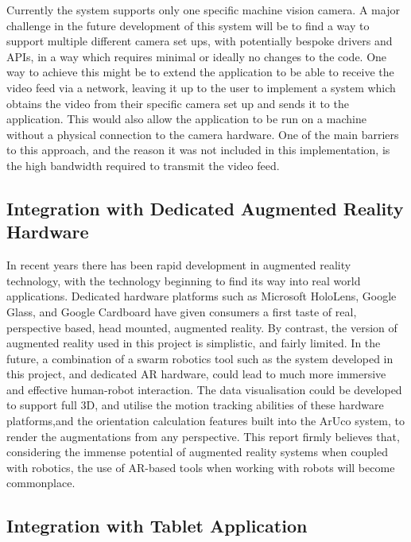 Currently the system supports only one specific machine vision camera. A major challenge in the future development of this system will be to find a way to support multiple different camera set ups, with potentially bespoke drivers and APIs, in a way which requires minimal or ideally no changes to the code. One way to achieve this might be to extend the application to be able to receive the video feed via a network, leaving it up to the user to implement a system which obtains the video from their specific camera set up and sends it to the application. This would also allow the application to be run on a machine without a physical connection to the camera hardware. One of the main barriers to this approach, and the reason it was not included in this implementation, is the high bandwidth required to transmit the video feed.


\subsection{Integration with Dedicated Augmented Reality Hardware}

In recent years there has been rapid development in augmented reality technology, with the technology beginning to find its way into real world applications. Dedicated hardware platforms such as Microsoft HoloLens, Google Glass, and Google Cardboard have given consumers a first taste of real, perspective based, head mounted, augmented reality. By contrast, the version of augmented reality used in this project is simplistic, and fairly limited. In the future, a combination of a swarm robotics tool such as the system developed in this project, and dedicated AR hardware, could lead to much more immersive and effective human-robot interaction. The data visualisation could be developed to support full 3D, and utilise the motion tracking abilities of these hardware platforms,and the orientation calculation features built into the ArUco system, to render the augmentations from any perspective. This report firmly believes that, considering the immense potential of augmented reality systems when coupled with robotics, the use of AR-based tools when working with robots will become commonplace.


\subsection{Integration with Tablet Application}

